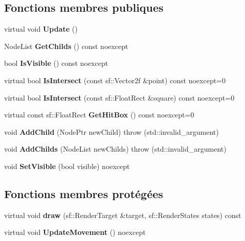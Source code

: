\subsection*{Fonctions membres publiques}
\begin{DoxyCompactItemize}
\item 
\mbox{\label{classmy_1_1Node_afe43c3936b45ba018babfae34dd08820}} 
virtual void {\bfseries Update} ()
\item 
\mbox{\label{classmy_1_1Node_aa57a107fbe9dae93903ea5799ffe8712}} 
Node\+List {\bfseries Get\+Childs} () const noexcept
\item 
\mbox{\label{classmy_1_1Node_a44d827884d796d63c0becfc9adbefd3e}} 
bool {\bfseries Is\+Visible} () const noexcept
\item 
\mbox{\label{classmy_1_1Node_ac7972cd7d8bd9eb2757a94b6ab62072a}} 
virtual bool {\bfseries Is\+Intersect} (const sf\+::\+Vector2f \&point) const noexcept=0
\item 
\mbox{\label{classmy_1_1Node_a3e5b63c91ce28392d64ce73c15b02ee0}} 
virtual bool {\bfseries Is\+Intersect} (const sf\+::\+Float\+Rect \&square) const noexcept=0
\item 
\mbox{\label{classmy_1_1Node_aed8cff06c09cf7fd8a1bd38212572930}} 
virtual const sf\+::\+Float\+Rect {\bfseries Get\+Hit\+Box} () const noexcept=0
\item 
\mbox{\label{classmy_1_1Node_ab687559c87eff28cd097f4fe0b3369a2}} 
void {\bfseries Add\+Child} (Node\+Ptr new\+Child)  throw (std\+::invalid\+\_\+argument)
\item 
\mbox{\label{classmy_1_1Node_a181cca5f4782bd73ecdfceb57e93994a}} 
void {\bfseries Add\+Childs} (Node\+List new\+Childs)  throw (std\+::invalid\+\_\+argument)
\item 
\mbox{\label{classmy_1_1Node_a096398315abb0abddc553a13dfefa5ca}} 
void {\bfseries Set\+Visible} (bool visible) noexcept
\end{DoxyCompactItemize}
\subsection*{Fonctions membres protégées}
\begin{DoxyCompactItemize}
\item 
\mbox{\label{classmy_1_1Node_a71ddeab220702a1329e436d890ba5c19}} 
virtual void {\bfseries draw} (sf\+::\+Render\+Target \&target, sf\+::\+Render\+States states) const
\item 
\mbox{\label{classmy_1_1Node_a70cf326c23afe568d5f450c0217258c0}} 
virtual void {\bfseries Update\+Movement} () noexcept
\end{DoxyCompactItemize}
